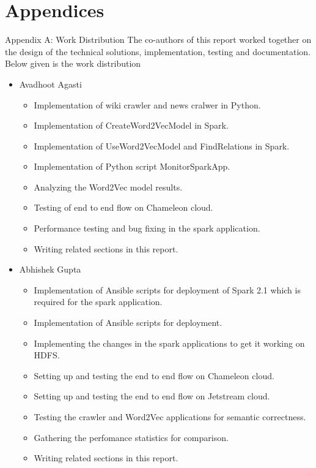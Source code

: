 \documentclass[9pt,twocolumn,twoside]{../../styles/osajnl}
\begin{document}
\section{Appendices}
Appendix A: Work Distribution
The co-authors of this report worked together on the design of the technical
solutions, implementation, testing and documentation. Below given is the work
 distribution
\begin{itemize}
\item Avadhoot Agasti
    \begin{itemize}
    \item Implementation of wiki crawler and news cralwer in Python.
    \item Implementation of CreateWord2VecModel in Spark.
    \item Implementation of UseWord2VecModel and FindRelations in Spark.
    \item Implementation of Python script MonitorSparkApp.
    \item Analyzing the Word2Vec model results.
    \item Testing of end to end flow on Chameleon cloud.
    \item Performance testing and bug fixing in the spark application.
    \item Writing related sections in this report.
    \end{itemize}

\item Abhishek Gupta
    \begin{itemize}
    \item Implementation of Ansible scripts for deployment of Spark 2.1 which
     is required for the spark application.
    \item Implementation of Ansible scripts for deployment.
    \item Implementing the changes in the spark applications to get it
    working on HDFS.
    \item Setting up and testing the end to end flow on Chameleon cloud.
    \item Setting up and testing the end to end flow on Jetstream cloud.
    \item Testing the crawler and Word2Vec applications for semantic
    correctness.
    \item Gathering the perfomance statistics for comparison.
    \item Writing related sections in this report.
    \end{itemize}
\end{itemize}



\end{document}
